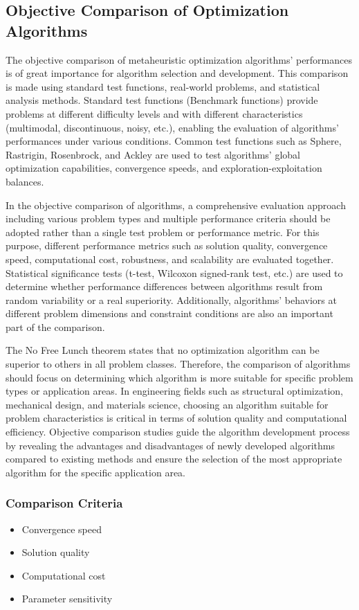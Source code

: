\subsection{Objective Comparison of Optimization Algorithms}

The objective comparison of metaheuristic optimization algorithms' performances is of great importance for algorithm selection and development. This comparison is made using standard test functions, real-world problems, and statistical analysis methods. Standard test functions (Benchmark functions) provide problems at different difficulty levels and with different characteristics (multimodal, discontinuous, noisy, etc.), enabling the evaluation of algorithms' performances under various conditions. Common test functions such as Sphere, Rastrigin, Rosenbrock, and Ackley are used to test algorithms' global optimization capabilities, convergence speeds, and exploration-exploitation balances.

In the objective comparison of algorithms, a comprehensive evaluation approach including various problem types and multiple performance criteria should be adopted rather than a single test problem or performance metric. For this purpose, different performance metrics such as solution quality, convergence speed, computational cost, robustness, and scalability are evaluated together. Statistical significance tests (t-test, Wilcoxon signed-rank test, etc.) are used to determine whether performance differences between algorithms result from random variability or a real superiority. Additionally, algorithms' behaviors at different problem dimensions and constraint conditions are also an important part of the comparison.

The No Free Lunch theorem states that no optimization algorithm can be superior to others in all problem classes. Therefore, the comparison of algorithms should focus on determining which algorithm is more suitable for specific problem types or application areas. In engineering fields such as structural optimization, mechanical design, and materials science, choosing an algorithm suitable for problem characteristics is critical in terms of solution quality and computational efficiency. Objective comparison studies guide the algorithm development process by revealing the advantages and disadvantages of newly developed algorithms compared to existing methods and ensure the selection of the most appropriate algorithm for the specific application area.

\subsubsection{Comparison Criteria}
\begin{itemize}
    \item Convergence speed
    \item Solution quality
    \item Computational cost
    \item Parameter sensitivity
\end{itemize} 